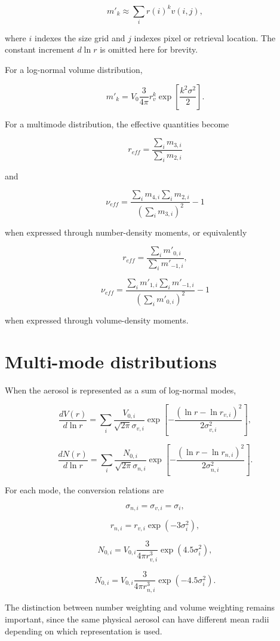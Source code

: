 \documentclass[
  letterpaper,
  open=any]{scrbook}
\begin{document}
\[
m'_k \approx \sum_i r(i)^k v(i,j),
\]

where \(i\) indexes the size grid and \(j\) indexes pixel or retrieval
location. The constant increment \(d\ln r\) is omitted here for brevity.

For a log-normal volume distribution,

\[
m'_k =V_{0} \frac{3}{4 \pi} r^{k}_v\exp\left[\frac{k^2\sigma^2}{2} \right].
\]

For a multimode distribution, the effective quantities become

\[
r_{eff}=\frac{\sum_i m_{3,i}}{\sum_i m_{2,i}}
\]

and

\[
\nu_{eff}=\frac{\sum_i m_{4,i} \sum_i m_{2,i}}{(\sum_i m_{3,i})^2}-1
\]

when expressed through number-density moments, or equivalently

\[
r_{eff}=\frac{\sum_i m'_{0,i}}{\sum_i m'_{-1,i}},
\]

\[
\nu_{eff}=\frac{\sum_i m'_{1,i} \sum_i m'_{-1,i}}{(\sum_i m'_{0,i})^2}-1
\]

when expressed through volume-density moments.

\section{Multi-mode distributions}\label{multi-mode-distributions}

When the aerosol is represented as a sum of log-normal modes,

\[
\frac{d V(r)}{d \ln r}= \sum_i \frac{V_{0,i}}{\sqrt{2 \pi} \sigma_{v,i}} \exp\left[-\frac{(\ln r-\ln r_{v,i})^2}{2 \sigma_{v,i}^2}\right],
\]

\[
\frac{d N(r)}{d \ln r}= \sum_i \frac{N_{0,i}}{\sqrt{2 \pi} \sigma_{n,i}} \exp\left[-\frac{(\ln r-\ln r_{n,i})^2}{2 \sigma_{n,i}^2}\right].
\]

For each mode, the conversion relations are

\[
\sigma_{n,i}=\sigma_{v,i}=\sigma_i,
\]

\[
r_{n,i}=r_{v,i} \exp(-3 \sigma_{i}^2),
\]

\[
N_{0,i}=V_{0,i} \frac{3}{4 \pi r_{v,i}^3}\exp(4.5 \sigma_{i}^2),
\]

\[
N_{0,i}=V_{0,i} \frac{3}{4 \pi r_{n,i}^3}\exp(-4.5 \sigma_{i}^2).
\]

The distinction between number weighting and volume weighting remains
important, since the same physical aerosol can have different mean radii
depending on which representation is used.
\end{document}
